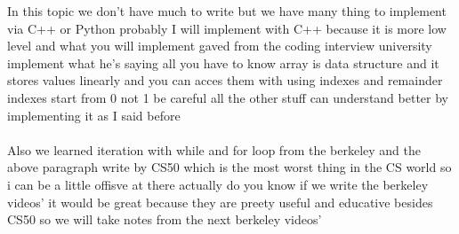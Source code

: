 In this topic we don't have much to write but we have many thing to implement
via C++ or Python probably I will implement with C++ because it is more low level
and what you will implement gaved from the coding interview university implement what
he's saying all you have to know array is data structure and it stores values linearly 
and you can acces them with using indexes and remainder indexes start from 0 not 1 be careful
all the other stuff can understand better by implementing it as I said before
\\\\
Also we learned iteration with while and for loop from the berkeley and the above paragraph
write by CS50 which is the most worst thing in the CS world so i can 
be a little offisve at there actually do you know if we write the berkeley videos'
it would be great because they are preety useful and educative besides CS50 
so we will take notes from the next berkeley videos'
